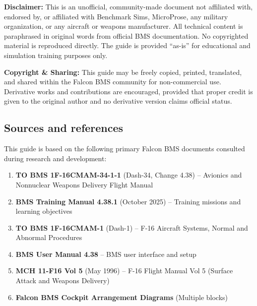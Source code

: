 \documentclass[11pt,a4paper]{article}
\begin{document}
\textbf{Disclaimer:} This is an unofficial, community-made document not affiliated with, endorsed by, or affiliated with Benchmark Sims, MicroProse, any military organization, or any aircraft or weapons manufacturer. All technical content is paraphrased in original words from official BMS documentation. No copyrighted material is reproduced directly. The guide is provided ``as-is'' for educational and simulation training purposes only.

\textbf{Copyright \& Sharing:} This guide may be freely copied, printed, translated, and shared within the Falcon BMS community for non-commercial use. Derivative works and contributions are encouraged, provided that proper credit is given to the original author and no derivative version claims official status.

\subsection{Sources and references}

This guide is based on the following primary Falcon BMS documents consulted during research and development:

\begin{enumerate}
  \item \textbf{TO BMS 1F-16CMAM-34-1-1} (Dash-34, Change 4.38) -- Avionics and Nonnuclear Weapons Delivery Flight Manual
  \item \textbf{BMS Training Manual 4.38.1} (October 2025) -- Training missions and learning objectives
  \item \textbf{TO BMS 1F-16CMAM-1} (Dash-1) -- F-16 Aircraft Systems, Normal and Abnormal Procedures
  \item \textbf{BMS User Manual 4.38} -- BMS user interface and setup
  \item \textbf{MCH 11-F16 Vol 5} (May 1996) -- F-16 Flight Manual Vol 5 (Surface Attack and Weapons Delivery)
  \item \textbf{Falcon BMS Cockpit Arrangement Diagrams} (Multiple blocks)
\end{enumerate}

\end{document}
